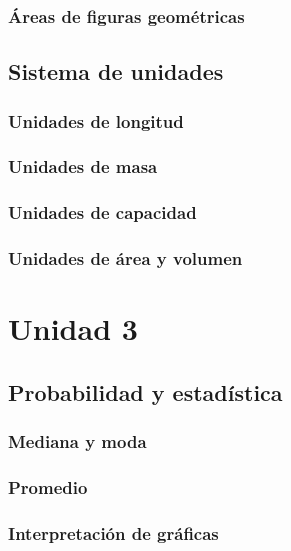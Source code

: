 \documentclass[12pt,repaso,answers]{RDS_unit}
\begin{document}
\begin{questions}
	\subsubsection{Áreas de figuras geométricas}
	\question[1]{}
	\subsection   {Sistema de unidades}
	\subsubsection{Unidades de longitud}
	\question[1]{}
	\subsubsection{Unidades de masa}
	\question[1]{}
	\subsubsection{Unidades de capacidad}
	\question[1]{}
	\subsubsection{Unidades de área y volumen}
	\question[1]{}

	\section{Unidad 3}
	\subsection   {Probabilidad y estadística}
	\subsubsection{Mediana y moda}
	\question[1]{}
	\subsubsection{Promedio}
	\question[1]{}
	\subsubsection{Interpretación de gráficas}
	\question[1]{}

\end{questions}
\end{document}
